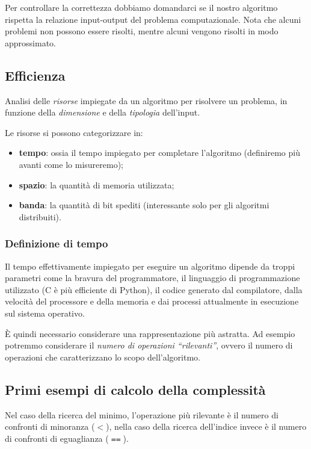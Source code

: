 Per controllare la correttezza dobbiamo domandarci se il nostro algoritmo rispetta la relazione input-output del problema computazionale.
Nota che alcuni problemi non possono essere risolti, mentre alcuni vengono risolti in modo approssimato.

\subsection{Efficienza}

\begin{definition}
Analisi delle \emph{risorse} impiegate da un algoritmo per risolvere un problema, in funzione della \emph{dimensione} e della \emph{tipologia} dell'input.
\end{definition}
Le risorse si possono categorizzare in:
\begin{itemize}
    \item \textbf{tempo}: ossia il tempo impiegato per completare l'algoritmo (definiremo più avanti come lo misureremo);
    \item \textbf{spazio}: la quantità di memoria utilizzata;
    \item \textbf{banda}: la quantità di bit spediti (interessante solo per gli algoritmi distribuiti).
\end{itemize}

\subsubsection{Definizione di tempo}

Il tempo effettivamente impiegato per eseguire un algoritmo dipende da troppi parametri come la bravura del programmatore, il linguaggio di programmazione utilizzato (C è più efficiente di Python), il codice generato dal compilatore, dalla velocità del processore e della memoria e dai processi attualmente in esecuzione sul sistema operativo.

\`E quindi necessario considerare una rappresentazione più astratta.
Ad esempio potremmo considerare il \emph{numero di operazioni \enquote{rilevanti}}, ovvero il numero di operazioni che caratterizzano lo scopo dell'algoritmo.

\subsection{Primi esempi di calcolo della complessità}

Nel caso della ricerca del minimo, l'operazione più rilevante è il numero di confronti di minoranza (\(<\)), nella caso della ricerca dell'indice invece è il numero di confronti di eguaglianza (\(\Equal\)).

